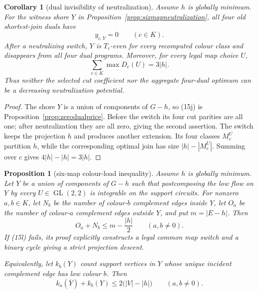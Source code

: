 \documentclass[11pt]{article}
\newtheorem{proposition}[theorem]{Proposition}
\newtheorem{corollary}[theorem]{Corollary}
\theoremstyle{definition}
\theoremstyle{remark}
\begin{document}
\begin{corollary}[dual invisibility of neutralization]
\label{cor:dualinvisibility}
Assume \(h\) is globally minimum.  For the witness shore \(Y\) in
Proposition~\ref{prop:sixmapneutralization}, all four old shortest-join
duals have
\[
                           y_{c,Y}=0\qquad(c\in K).       \tag{15j}
\]
After a neutralizing switch, \(Y\) is \(T_c\)-even for every recomputed
colour class and disappears from all four dual programs.  Moreover, for
every legal map choice \(U\),
\[
                     \sum_{c\in K}\max D_c(U)=3|h|.      \tag{15k}
\]
Thus neither the selected cut coefficient nor the aggregate four-dual
optimum can be a decreasing neutralization potential.
\end{corollary}

\begin{proof}
The shore \(Y\) is a union of components of \(G-h\), so (15j) is
Proposition~\ref{prop:zerodualprice}.  Before the switch its four cut
parities are all one; after neutralization they are all zero, giving the
second assertion.  The switch keeps the projection \(h\) and produces
another extension.  Its four classes \(M_c^U\) partition \(h\), while the
corresponding optimal join has size \(|h|-|M_c^U|\).  Summing over \(c\)
gives \(4|h|-|h|=3|h|\).
\end{proof}

\begin{proposition}[six-map colour-load inequality]
\label{prop:colorload}
Assume \(h\) is globally minimum.  Let \(Y\) be a union of components of
\(G-h\) such that postcomposing the low flow on \(Y\) by every
\(U\in\operatorname{GL}(2,2)\) is integrable on the support circuits.  For nonzero
\(a,b\in K\), let \(N_b\) be the number of colour-\(b\) complement edges
inside \(Y\), let \(O_a\) be the number of colour-\(a\) complement edges
outside \(Y\), and put \(m=|E-h|\).  Then
\[
                       O_a+N_b\le m-\frac{|h|}{2}
                       \qquad(a,b\ne0).                   \tag{15l}
\]
If (15l) fails, its proof explicitly constructs a legal common map
switch and a binary cycle giving a strict projection descent.

Equivalently, let \(k_b(Y)\) count support vertices in \(Y\) whose unique
incident complement edge has low colour \(b\).  Then
\[
                k_a(\overline Y)+k_b(Y)
                         \le2\bigl(|V|-|h|\bigr)
                         \qquad(a,b\ne0).                 \tag{15m}
\]
\end{proposition}
\end{document}
